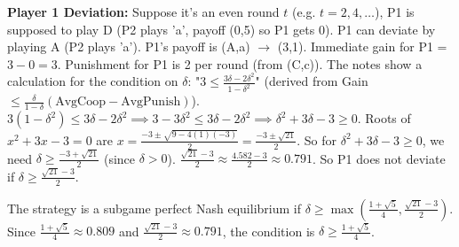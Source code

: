 \begin{solution}
\begin{enumerate}
    \textbf{Player 1 Deviation:}
    Suppose it's an even round $t$ (e.g. $t=2,4,\dots$), P1 is supposed to play D (P2 plays 'a', payoff (0,5) so P1 gets 0).
    P1 can deviate by playing A (P2 plays 'a'). P1's payoff is (A,a) $\rightarrow$ (3,1).
    Immediate gain for P1 = $3 - 0 = 3$.
    Punishment for P1 is 2 per round (from (C,c)).
    The notes show a calculation for the condition on $\delta$: "$3 \le \frac{3\delta-2\delta^2}{1-\delta^2}$" (derived from Gain $\le \frac{\delta}{1-\delta} (\text{AvgCoop} - \text{AvgPunish})$).
    $3(1-\delta^2) \le 3\delta-2\delta^2 \implies 3-3\delta^2 \le 3\delta-2\delta^2 \implies \delta^2+3\delta-3 \ge 0$.
    Roots of $x^2+3x-3=0$ are $x = \frac{-3 \pm \sqrt{9-4(1)(-3)}}{2} = \frac{-3 \pm \sqrt{21}}{2}$.
    So for $\delta^2+3\delta-3 \ge 0$, we need $\delta \ge \frac{-3+\sqrt{21}}{2}$ (since $\delta>0$).
    $\frac{\sqrt{21}-3}{2} \approx \frac{4.582-3}{2} \approx 0.791$.
    So P1 does not deviate if $\delta \ge \frac{\sqrt{21}-3}{2}$.

    The strategy is a subgame perfect Nash equilibrium if $\delta \ge \max\left(\frac{1+\sqrt{5}}{4}, \frac{\sqrt{21}-3}{2}\right)$.
    Since $\frac{1+\sqrt{5}}{4} \approx 0.809$ and $\frac{\sqrt{21}-3}{2} \approx 0.791$, the condition is $\delta \ge \frac{1+\sqrt{5}}{4}$.
\end{enumerate}
\end{solution}

